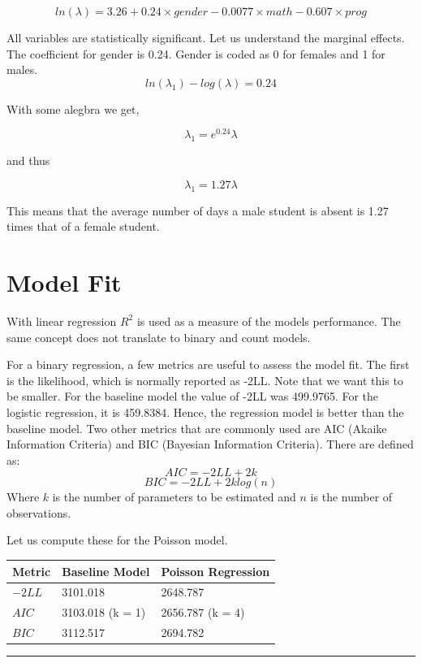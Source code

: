 \documentclass[
]{article}
\begin{document}
\[ln(\lambda) = 3.26 + 0.24 \times gender -0.0077 \times math -0.607 \times prog\]

All variables are statistically significant. Let us understand the
marginal effects. The coefficient for gender is 0.24. Gender is coded as
0 for females and 1 for males. \[ln(\lambda_1) - log(\lambda) = 0.24\]

With some alegbra we get,

\[\lambda_1 = e^{0.24} \lambda\]

and thus

\[\lambda_1 = 1.27\lambda\]

This means that the average number of days a male student is absent is
1.27 times that of a female student.

\hypertarget{model-fit}{%
\section{Model Fit}\label{model-fit}}

With linear regression \(R^2\) is used as a measure of the models
performance. The same concept does not translate to binary and count
models.

For a binary regression, a few metrics are useful to assess the model
fit. The first is the likelihood, which is normally reported as -2LL.
Note that we want this to be smaller. For the baseline model the value
of -2LL was 499.9765. For the logistic regression, it is 459.8384.
Hence, the regression model is better than the baseline model. Two other
metrics that are commonly used are AIC (Akaike Information Criteria) and
BIC (Bayesian Information Criteria). There are defined as:
\[𝐴𝐼𝐶 = −2𝐿𝐿 + 2𝑘\] \[𝐵𝐼𝐶 = −2𝐿𝐿 + 2𝑘𝑙𝑜𝑔(𝑛)\] Where \(k\) is the number
of parameters to be estimated and \(n\) is the number of observations.

Let us compute these for the Poisson model.

\begin{longtable}[]{@{}lll@{}}
\toprule()
Metric & Baseline Model & Poisson Regression \\
\midrule()
\endhead
\(-2LL\) & 3101.018 & 2648.787 \\
\(AIC\) & 3103.018 (k = 1) & 2656.787 (k = 4) \\
\(BIC\) & 3112.517 & 2694.782 \\
\bottomrule()
\end{longtable}

\begin{center}\rule{0.5\linewidth}{0.5pt}\end{center}
\end{document}
